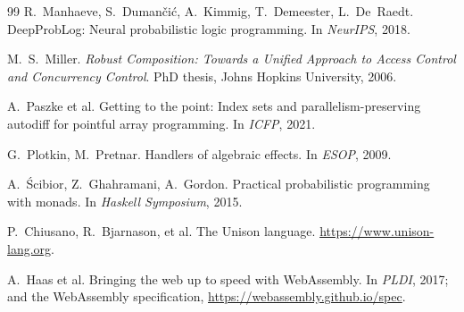 \documentclass[11pt]{article}
\begin{document}
\begin{thebibliography}{99}
 R.~Manhaeve, S.~Duman\v{c}i\'c, A.~Kimmig, T.~Demeester, L.~De~Raedt. DeepProbLog: Neural probabilistic logic programming. In \emph{NeurIPS}, 2018.

 M.~S.~Miller. \emph{Robust Composition: Towards a Unified Approach to Access Control and Concurrency Control}. PhD thesis, Johns Hopkins University, 2006.

 A.~Paszke et al. Getting to the point: Index sets and parallelism-preserving autodiff for pointful array programming. In \emph{ICFP}, 2021.

 G.~Plotkin, M.~Pretnar. Handlers of algebraic effects. In \emph{ESOP}, 2009.

 A.~\'Scibior, Z.~Ghahramani, A.~Gordon. Practical probabilistic programming with monads. In \emph{Haskell Symposium}, 2015.

 P.~Chiusano, R.~Bjarnason, et al. The Unison language. \url{https://www.unison-lang.org}.

 A.~Haas et al. Bringing the web up to speed with WebAssembly. In \emph{PLDI}, 2017; and the WebAssembly specification, \url{https://webassembly.github.io/spec}.

\end{thebibliography}
\end{document}
